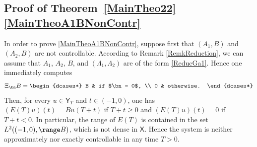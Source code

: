 \subsection{Proof of Theorem~\ref{MainTheo22}\eqref{MainTheoA1BNonContr}}

In order to prove \eqref{MainTheoA1BNonContr}, suppose first that $(A_1, B)$ and $(A_2, B)$ are not controllable. According to Remark \ref{RemkReduction}, we can assume that $A_1$, $A_2$, $B$, and $(\Lambda_1, \Lambda_2)$ are of the form \eqref{ReducGa1}. Hence one immediately computes
\[
\Xi_{\bn} B =
\begin{dcases*}
B & if $\bn = 0$, \\
0 & otherwise.
\end{dcases*}
\]
Then, for every $u \in \mathsf Y_T$ and $t \in (-1, 0)$, one has $(E(T) u)(t) = B u(T + t)$ if $T + t \geq 0$ and $(E(T) u)(t) = 0$ if $T + t < 0$. In particular, the range of $E(T)$ is contained in the set $L^2((-1, 0), \range B)$, which is not dense in $\mathsf X$. Hence the system is neither approximately nor exactly controllable in any time $T > 0$.

